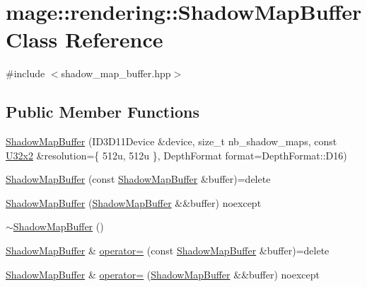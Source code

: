 \hypertarget{classmage_1_1rendering_1_1_shadow_map_buffer}{}\section{mage\+:\+:rendering\+:\+:Shadow\+Map\+Buffer Class Reference}
\label{classmage_1_1rendering_1_1_shadow_map_buffer}


{\ttfamily \#include $<$shadow\+\_\+map\+\_\+buffer.\+hpp$>$}

\subsection*{Public Member Functions}
\begin{DoxyCompactItemize}
\item 
\mbox{\hyperlink{classmage_1_1rendering_1_1_shadow_map_buffer_ad1d94bf0e4ca227064bc5e83d01f3af0}{Shadow\+Map\+Buffer}} (I\+D3\+D11\+Device \&device, size\+\_\+t nb\+\_\+shadow\+\_\+maps, const \mbox{\hyperlink{namespacemage_a31f2bb52b5080e706e1c13de07c0a249}{U32x2}} \&resolution=\{ 512u, 512u \}, Depth\+Format format=\+Depth\+Format\+::\+D16)
\item 
\mbox{\hyperlink{classmage_1_1rendering_1_1_shadow_map_buffer_a9468f0c15337f9036238233fa17bbcd2}{Shadow\+Map\+Buffer}} (const \mbox{\hyperlink{classmage_1_1rendering_1_1_shadow_map_buffer}{Shadow\+Map\+Buffer}} \&buffer)=delete
\item 
\mbox{\hyperlink{classmage_1_1rendering_1_1_shadow_map_buffer_ac7e9131739e3ec2781d4d445cea906f4}{Shadow\+Map\+Buffer}} (\mbox{\hyperlink{classmage_1_1rendering_1_1_shadow_map_buffer}{Shadow\+Map\+Buffer}} \&\&buffer) noexcept
\item 
\mbox{\hyperlink{classmage_1_1rendering_1_1_shadow_map_buffer_afdce2b148b1ecca6a29db3f5019a8f7a}{$\sim$\+Shadow\+Map\+Buffer}} ()
\item 
\mbox{\hyperlink{classmage_1_1rendering_1_1_shadow_map_buffer}{Shadow\+Map\+Buffer}} \& \mbox{\hyperlink{classmage_1_1rendering_1_1_shadow_map_buffer_a51f61c027adeb55d39767f1be36dd404}{operator=}} (const \mbox{\hyperlink{classmage_1_1rendering_1_1_shadow_map_buffer}{Shadow\+Map\+Buffer}} \&buffer)=delete
\item 
\mbox{\hyperlink{classmage_1_1rendering_1_1_shadow_map_buffer}{Shadow\+Map\+Buffer}} \& \mbox{\hyperlink{classmage_1_1rendering_1_1_shadow_map_buffer_a09a2616afc836a3c8c21347a4473eb08}{operator=}} (\mbox{\hyperlink{classmage_1_1rendering_1_1_shadow_map_buffer}{Shadow\+Map\+Buffer}} \&\&buffer) noexcept

\end{DoxyCompactItemize}

